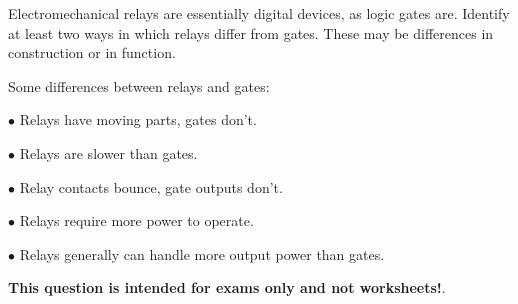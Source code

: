 

Electromechanical relays are essentially digital devices, as logic gates are.  Identify at least two ways in which relays differ from gates.  These may be differences in construction or in function.







Some differences between relays and gates:

\medskip
\item{$\bullet$} Relays have moving parts, gates don't.
\item{$\bullet$} Relays are slower than gates.
\item{$\bullet$} Relay contacts bounce, gate outputs don't.
\item{$\bullet$} Relays require more power to operate.
\item{$\bullet$} Relays generally can handle more output power than gates.
\medskip







{\bf This question is intended for exams only and not worksheets!}.




